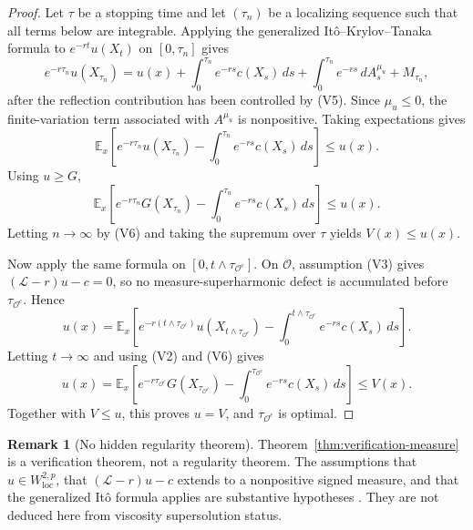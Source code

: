 \documentclass[pdflatex,sn-mathphys-num]{sn-jnl}
\theoremstyle{plain}
\theoremstyle{definition}
\newtheorem{remark}[theorem]{Remark}
\begin{document}
\begin{proof}
Let $\tau$ be a stopping time and let $(\tau_n)$ be a localizing sequence such
that all terms below are integrable. Applying the generalized
It\^o--Krylov--Tanaka formula \cite{krylov1987approach,revuz2013continuous} to
$e^{-rt}u(X_t)$ on $[0,\tau_n]$ gives
\[
   e^{-r\tau_n}u(X_{\tau_n})
   =
   u(x)
   +\int_0^{\tau_n}e^{-rs}c(X_s)\,ds
   +\int_0^{\tau_n}e^{-rs}\,dA_s^{\mu_u}
   +M_{\tau_n},
\]
after the reflection contribution has been controlled by \textup{(V5)}. Since
$\mu_u\le0$, the finite-variation term associated with $A^{\mu_u}$ is
nonpositive. Taking expectations gives
\[
   \mathbb E_x\left[
      e^{-r\tau_n}u(X_{\tau_n})
      -\int_0^{\tau_n}e^{-rs}c(X_s)\,ds
   \right]
   \le u(x).
\]
Using $u\ge G$,
\[
   \mathbb E_x\left[
      e^{-r\tau_n}G(X_{\tau_n})
      -\int_0^{\tau_n}e^{-rs}c(X_s)\,ds
   \right]
   \le u(x).
\]
Letting $n\to\infty$ by \textup{(V6)} and taking the supremum over $\tau$
yields $V(x)\le u(x)$.

Now apply the same formula on $[0,t\wedge\tau_{\mathcal O^c}]$. On
$\mathcal O$, assumption \textup{(V3)} gives $(\mathcal L-r)u-c=0$, so no
measure-superharmonic defect is accumulated before $\tau_{\mathcal O^c}$. Hence
\[
   u(x)
   =
   \mathbb E_x\left[
      e^{-r(t\wedge\tau_{\mathcal O^c})}
      u(X_{t\wedge\tau_{\mathcal O^c}})
      -\int_0^{t\wedge\tau_{\mathcal O^c}}e^{-rs}c(X_s)\,ds
   \right].
\]
Letting $t\to\infty$ and using \textup{(V2)} and \textup{(V6)} gives
\[
   u(x)
   =
   \mathbb E_x\left[
      e^{-r\tau_{\mathcal O^c}}G(X_{\tau_{\mathcal O^c}})
      -\int_0^{\tau_{\mathcal O^c}}e^{-rs}c(X_s)\,ds
   \right]
   \le V(x).
\]
Together with $V\le u$, this proves $u=V$, and $\tau_{\mathcal O^c}$ is
optimal.
\end{proof}

\begin{remark}[No hidden regularity theorem]
\label{rem:no-hidden-regularity}
Theorem~\ref{thm:verification-measure} is a verification theorem, not a
regularity theorem. The assumptions that $u\in W^{2,p}_{\mathrm{loc}}$, that
$(\mathcal L-r)u-c$ extends to a nonpositive signed measure, and that the
generalized It\^o formula applies are substantive hypotheses
\cite{krylov1987approach,bensoussan2011applications,yu2026from,friedman1982variational}. They are not deduced here
from viscosity supersolution status.
\end{remark}

\end{document}

